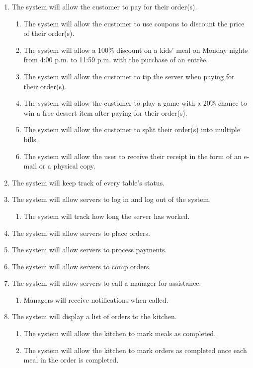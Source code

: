 \documentclass[12pt]{article}
\begin{document}
\begin{enumerate}
			\item The system will allow the customer to pay for their order(s).
				\begin{enumerate}
					\item The system will allow the customer to use coupons to discount the price of their order(s).
					\item The system will allow a 100\% discount on a kids' meal on Monday nights from 4:00 p.m. to 11:59 p.m. with the purchase of an entr\`ee.
					\item The system will allow the customer to tip the server when paying for their order(s).
					\item The system will allow the customer to play a game with a 20\% chance to win a free dessert item after paying for their order(s).
					\item The system will allow the customer to split their order(s) into multiple bills.
					\item The system will allow the user to receive their receipt in the form of an e-mail or a physical copy.
				\end{enumerate}

			\item The system will keep track of every table's status.

			\item The system will allow servers to log in and log out of the system.
				\begin{enumerate}
					\item The system will track how long the server has worked.
				\end{enumerate}

			\item The system will allow servers to place orders.

			\item The system will allow servers to process payments.

			\item The system will allow servers to comp orders.

			\item The system will allow servers to call a manager for assistance.
				\begin{enumerate}
					\item Managers will receive notifications when called.
				\end{enumerate}

			\item The system will display a list of orders to the kitchen.
				\begin{enumerate}
					\item The system will allow the kitchen to mark meals as completed.
					\item The system will allow the kitchen to mark orders as completed once each meal in the order is completed.
				\end{enumerate}


\end{enumerate}
\end{document}
